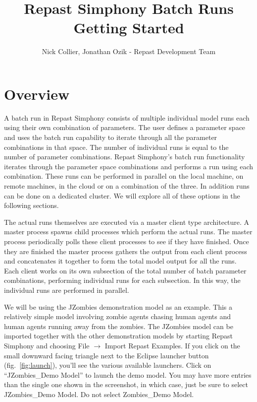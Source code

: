 \documentclass[11pt]{amsart}
\title{Repast Simphony Batch Runs Getting Started}
\author{Nick Collier, Jonathan Ozik  - Repast Development Team}
\begin{document}
\maketitle
\setcounter{section}{-1}



\section{Overview}
A batch run in Repast Simphony consists of multiple individual model runs each using their own combination of parameters. The user defines a parameter space and uses the batch run capability to iterate through all the parameter combinations in that space. The number of individual runs is equal to the number of parameter combinations. Repast Simphony's batch run functionality iterates through the parameter space combinations and performs a run using each combination.  These runs can be performed in parallel on the local machine, on remote machines, in the cloud or on a combination of the three. In addition runs can be done on a dedicated cluster. We will explore all of these options in the following sections.

The actual runs themselves are executed via a master client type architecture. A master process spawns child processes which perform the actual runs. The master process periodically polls these client processes to see if they have finished. Once they are finished the master process gathers the output from each client process and concatenates it together to form the total model output for all the runs.  Each client works on its own subsection of the total number of batch parameter combinations, performing individual runs for each subsection. In this way, the individual runs are performed in parallel.

\label{sec:launch_model}
We will be using the JZombies demonstration model as an example. This a relatively simple model involving zombie agents chasing human agents and human agents running away from the zombies. The JZombies model can be imported together with the other demonstration models by starting Repast Simphony and choosing File $\rightarrow$ Import Repast Examples. If you click on the small downward facing triangle next to the Eclipse launcher button (fig.~\ref{fig:launch}), you'll see the various available launchers. Click on ``JZombies\_Demo Model'' to launch the demo model. You may have more entries than the single one shown in the screenshot, in which case, just be sure to select JZombies\_Demo Model. Do not select Zombies\_Demo Model.
\end{document}
